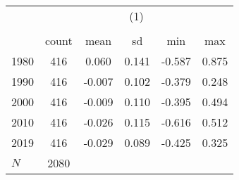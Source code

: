 {
\def\sym#1{\ifmmode^{#1}\else\(^{#1}\)\fi}
\begin{tabular}{l*{1}{ccccc}}
\toprule
            &\multicolumn{5}{c}{(1)}                                         \\
            &\multicolumn{5}{c}{}                                            \\
            &       count&        mean&          sd&         min&         max\\
\midrule
1980        &         416&       0.060&       0.141&      -0.587&       0.875\\
1990        &         416&      -0.007&       0.102&      -0.379&       0.248\\
2000        &         416&      -0.009&       0.110&      -0.395&       0.494\\
2010        &         416&      -0.026&       0.115&      -0.616&       0.512\\
2019        &         416&      -0.029&       0.089&      -0.425&       0.325\\
\midrule
\(N\)       &        2080&            &            &            &            \\
\bottomrule
\end{tabular}
}
